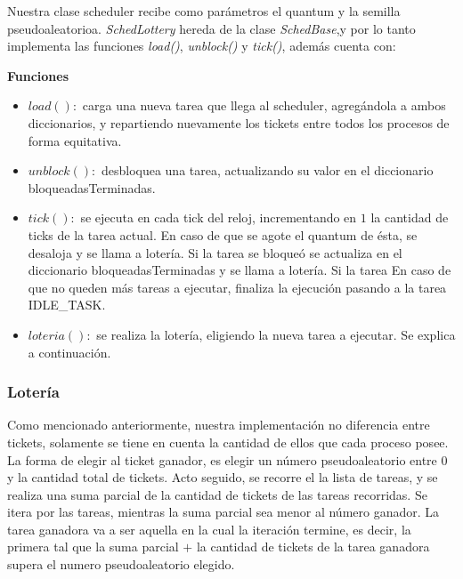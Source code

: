 \vspace{2mm}

Nuestra clase scheduler recibe como par\'ametros el quantum y la semilla pseudoaleatorioa. \textit{SchedLottery} hereda de la clase \textit{SchedBase},y por lo tanto implementa las funciones \textit{load()}, \textit{unblock()} y \textit{tick()}, adem\'as cuenta con:


\vspace{2mm}

\textbf{Funciones}

\begin{itemize}

\item $load():$ carga una nueva tarea que llega al scheduler, agreg\'andola a ambos diccionarios, y repartiendo nuevamente los tickets entre todos los procesos de forma equitativa.

\item $unblock(): $ desbloquea una tarea, actualizando su valor en el diccionario bloqueadasTerminadas.

\item $tick(): $ se ejecuta en cada tick del reloj, incrementando en $1$ la cantidad de ticks de la tarea actual. En caso de que se agote el quantum de \'esta, se desaloja y se llama a loter\'ia. Si la tarea se bloque\'o se actualiza en el diccionario bloqueadasTerminadas y se llama a loter\'ia. Si la tarea En caso de que no queden m\'as tareas a ejecutar, finaliza la ejecuci\'on pasando a la tarea IDLE\_TASK.
\item $loteria(): $ se realiza la loter\'ia, eligiendo la nueva tarea a ejecutar. Se explica a continuaci\'on.

\end{itemize}

\subsubsection{Loter\'ia}

Como mencionado anteriormente, nuestra implementaci\'on no diferencia entre tickets, solamente se tiene en cuenta la cantidad de ellos que cada proceso posee. La forma de elegir al ticket ganador, es elegir un n\'umero pseudoaleatorio entre 0 y la cantidad total de tickets. Acto seguido, se recorre el la lista de tareas, y se realiza una suma parcial de la cantidad de tickets de las tareas recorridas. Se itera por las tareas, mientras la suma parcial sea menor al n\'umero ganador. La tarea ganadora va a ser aquella en la cual la iteraci\'on termine, es decir, la primera tal que la suma parcial $+$ la cantidad de tickets de la tarea ganadora supera el numero pseudoaleatorio elegido.

